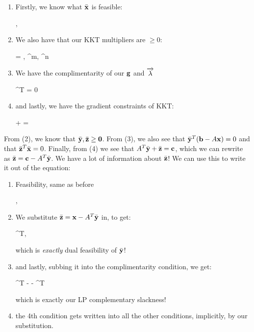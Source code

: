 \begin{enumerate}
	\item Firstly, we know what $\bar{\mathbf{x}}$ is feasible:
\begin{frml}
	\vA\bx \geq \vb, \\
	\bx \geq \vzero
\end{frml}
\item We also have that our KKT multipliers are $\geq 0$:
\begin{frml}
	\vlambda = \mat{\by \\ \bz} \geq \vzero, \by \in \reals^m, \; \bz \in 
	\reals^n
\end{frml}
\item
We have the complimentarity of our $\mathbf{g}$ and $\overrightarrow{\lambda}$
\begin{frml}
	\mat{\by \\ \bz}^T \mat{\vb - \vA\bx \\ -\bx} = 0 \\
\end{frml}
\item and lastly, we have the gradient constraints of KKT:
\begin{frml}
	\vc + \mat{\by \\ \bz} = \vzero
\end{frml}
\end{enumerate}

From (2), we know that $\bar{\mathbf{y}}, \bar{\mathbf{z}} \geq \mathbf{0}$. From (3), we also see that
$\bar{\mathbf{y}}^T(\mathbf{b} - A\mathbf{x}) = 0$ and that $\bar{\mathbf{z}}^T\bar{\mathbf{x}} = 0$. Finally, from (4) we see that
$A^T\bar{\mathbf{y}} + \bar{\mathbf{z}} = \mathbf{c}$, which we can rewrite as $\bar{\mathbf{z}} = \mathbf{c} - A^T\bar{\mathbf{y}}$.
We have a lot of information about $\bar{\mathbf{z}}$! We can use this to
write it out of the equation:
\begin{enumerate}
	\item Feasibility, same as before
\begin{frml}
	\vA\vx \geq \vb, \\
	\vx \geq \vzero
\end{frml}
\item
	We substitute $\bar{\mathbf{z}} = \mathbf{x} - A^T\bar{\mathbf{y}}$ in, to get:
\begin{frml}
	 \geq \vzero \implies
	\vA^T\vy \leq \vc, \; \vy \geq \vzero
\end{frml}
which is \textit{exactly} dual feasibility of $\bar{\mathbf{y}}$!
\item and lastly, subbing it into the complimentarity condition, we get:
\begin{frml}
	\by^T \perp \vA\bx - \vb 
	 \bx \perp \vc - \vA^T\by
\end{frml}
which is exactly our LP complementary slackness!
\item the 4th condition gets written into all the other conditions, implicitly,
	by our substitution.
\end{enumerate}

